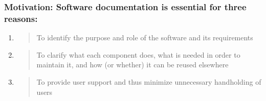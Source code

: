 \documentclass[]{article}
\date{}
\begin{document}
\pagestyle{fancy}
\renewcommand{\headrulewidth}{0pt}
  
\thispagestyle{empty}
\textbf{\newline}
\textbf{\newline}
\textbf{\newline}

\subsubsection{\texorpdfstring{\textbf{Motivation}: Software
documentation is essential for three
reasons:}{Motivation: Software documentation is essential for three reasons:}}\label{motivation-software-documentation-is-essential-for-three-reasons}

\begin{enumerate}
\def\labelenumi{(\arabic{enumi})}
\item
  \begin{quote}
  To identify the purpose and role of the software and its requirements
  \end{quote}
\item
  \begin{quote}
  To clarify what each component does, what is needed in order to
  maintain it, and how (or whether) it can be reused elsewhere
  \end{quote}
\item
  \begin{quote}
  To provide user support and thus minimize unnecessary handholding of
  users
  \end{quote}
\end{enumerate}
\end{document}
